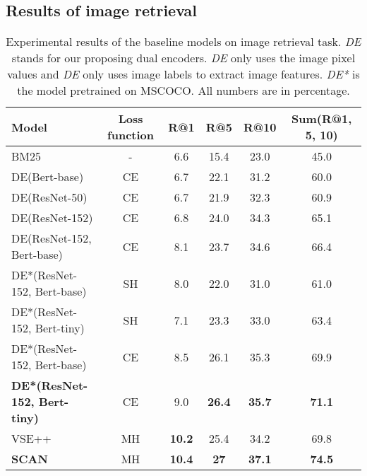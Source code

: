 \documentclass[11pt,a4paper]{article}
\begin{document}
\subsection{Results of image retrieval}

\begin{table*}[t]
\caption{Experimental results of the baseline models on image retrieval task. \textit{DE} stands for our proposing dual encoders. \textit{DE} only uses the image pixel values and \textit{DE} only uses image labels to extract image features. \textit{DE*} is the model pretrained on MSCOCO. All numbers are in percentage.} \label{tab:results}
\centering
\small
\begin{tabular}{l|c|c|c|c|c}
\hline
{\textbf{Model}} & \textbf{Loss function} & \textbf{R@1}  & \textbf{R@5}  & \textbf{R@10}  & \textbf{Sum(R@1, 5, 10)} \\ \hline
BM25 & - & 6.6 & 15.4 & 23.0 & 45.0 \\ \hline  \hline
DE(Bert-base) & CE & 6.7 & 22.1 & 31.2 & 60.0 \\ \hline
DE(ResNet-50) & CE & 6.7 & 21.9	& 32.3 & 60.9  \\ \hline
DE(ResNet-152) & CE & 6.8 & 24.0 & 34.3 & 65.1 \\ \hline
DE(ResNet-152, Bert-base) & CE & 8.1 & 23.7 & 34.6 & 66.4 \\ \hline
DE*(ResNet-152, Bert-base) & SH & 8.0 & 22.0 & 31.0 & 61.0 \\ \hline
DE*(ResNet-152, Bert-tiny) & SH & 7.1 & 23.3 & 33.0 & 63.4 \\ \hline
DE*(ResNet-152, Bert-base) & CE & 8.5 & 26.1 & 35.3 & 69.9 \\ \hline
\textbf{DE*(ResNet-152, Bert-tiny)} & CE & 9.0 &  \textbf{26.4} & \textbf{35.7} & \textbf{71.1} \\ \hline 
VSE++ & MH & \textbf{10.2} & 25.4 & 34.2 & 69.8  \\ \hline \hline
\textbf{SCAN} & MH & \textbf{10.4} & \textbf{27} & \textbf{37.1} & \textbf{74.5} \\ \hline
\end{tabular}
\vspace{-3mm}
\end{table*}
\end{document}
